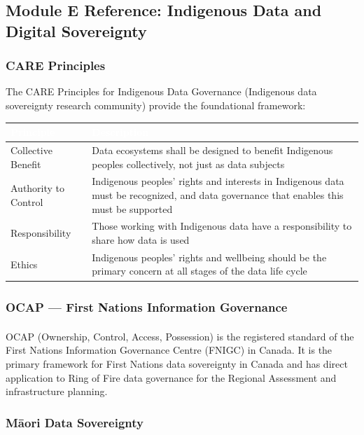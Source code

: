 \documentclass[11pt,letterpaper]{article}
\newcommand{\tableheader}[1]{\textbf{\sffamily\textcolor{white}{#1}}}
\begin{document}
\subsection{Module E Reference: Indigenous Data and Digital Sovereignty}

\subsubsection{CARE Principles}

The CARE Principles for Indigenous Data Governance (Indigenous data sovereignty research community) provide the foundational framework:

\begin{center}
\begin{tabularx}{\textwidth}{L{3cm}X}
\toprule
{}
\tableheader{Principle} & \tableheader{Description} \\
\midrule
Collective Benefit & Data ecosystems shall be designed to benefit Indigenous peoples collectively, not just as data subjects \\
Authority to Control & Indigenous peoples' rights and interests in Indigenous data must be recognized, and data governance that enables this must be supported \\
Responsibility & Those working with Indigenous data have a responsibility to share how data is used \\
Ethics & Indigenous peoples' rights and wellbeing should be the primary concern at all stages of the data life cycle \\
\bottomrule
\end{tabularx}
\end{center}

\subsubsection{OCAP\textsuperscript{\textregistered} --- First Nations Information Governance}

OCAP\textsuperscript{\textregistered} (Ownership, Control, Access, Possession) is the registered standard of the First Nations Information Governance Centre (FNIGC) in Canada. It is the primary framework for First Nations data sovereignty in Canada and has direct application to Ring of Fire data governance for the Regional Assessment and infrastructure planning.

\subsubsection{Māori Data Sovereignty}
\end{document}
